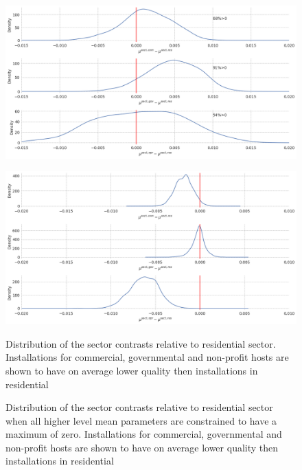 \documentclass[a4paper]{article}
\begin{document}


\begin{figure} [!htb]
\begin{minipage}{.48\textwidth}
  \centering
  \includegraphics[width=1\linewidth]{figures/mu_sectors.png}
  \label{fig:mu_sectors}
 \end{minipage}\qquad
\begin{minipage}{.48\textwidth}
  \centering
  \includegraphics[width=1\linewidth]{figures/mu_sectors_const.png}
  \label{fig:mu_sectors_const}
 \end{minipage}

\bigskip

\begin{minipage}[t]{.48\textwidth}
\centering
 \caption{Distribution of the sector contrasts relative to residential sector. Installations for commercial, governmental and non-profit hosts are shown to have on average lower quality then installations in residential}
\end{minipage}\qquad
\begin{minipage}[t]{.48\textwidth}
\centering
 \caption{Distribution of the sector contrasts relative to residential sector when all higher level mean parameters are constrained to have a maximum of zero. Installations for commercial, governmental and non-profit hosts are shown to have on average lower quality then installations in residential}
\end{minipage}
\end{figure}
\end{document}
